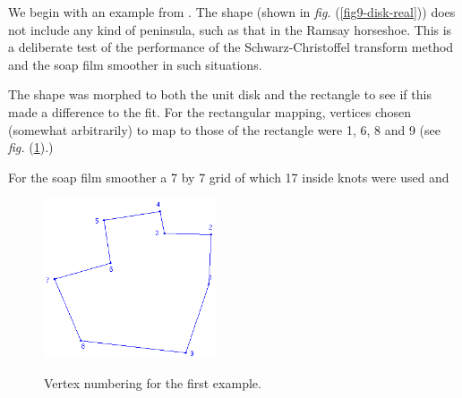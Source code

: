 \documentclass[a4paper,10pt]{amsart}
\newcommand{\sch}{Schwarz-Christoffel }
\newcommand{\fig}[1]{\emph{fig.} (\ref{#1})}
\begin{document}
We begin with an example from \cite{miller09}. The shape (shown in \fig{fig9-disk-real}) does not include any kind of peninsula, such as that in the Ramsay horseshoe. This is a deliberate test of the performance of the \sch transform method and the soap film smoother in such situations. 

The shape was morphed to both the unit disk and the rectangle to see if this made a difference to the fit. For the rectangular mapping, vertices chosen (somewhat arbitrarily) to map to those of the rectangle were 1, 6, 8 and 9 (see \fig{fig9-numbered}.)

For the soap film smoother a 7 by 7 grid of which 17 inside knots were used and 

\begin{figure}[tbp]
\centering
\includegraphics[width=2in]{figs-otherdomains/fig9-numbered.png} \\
\caption{Vertex numbering for the first example.}
\label{fig9-numbered}
\end{figure}
\end{document}
